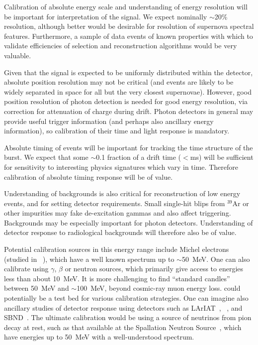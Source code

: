 Calibration of absolute energy scale and understanding of energy resolution will be important for interpretation of the signal. We expect nominally $\sim$\num{20}\% resolution, although better would be desirable for resolution of supernova spectral features. Furthermore, a sample of data events of known properties with which to validate efficiencies of selection and reconstruction algorithms would be very valuable.

Given that the signal is expected to be uniformly distributed within the detector, absolute position resolution may not be critical (and events are likely to be widely separated in space for all but the very closest supernovae). However, good position resolution of photon detection is needed for good energy resolution, via correction for attenuation of charge during drift. Photon detectors in general may provide useful trigger information (and perhaps also ancillary energy information), so calibration of their time and light response is mandatory.

Absolute timing of events will be important for tracking the time structure of the burst. We expect that some $\sim$\num{0.1} fraction of a drift time ($<$\si{\ms}) will be sufficient for sensitivity to interesting physics signatures which vary in time. Therefore calibration of absolute timing response will be of value.

Understanding of backgrounds is also critical for reconstruction of low energy events, and for setting detector requirements. Small single-hit blips from $^{39}$Ar or other impurities may fake de-excitation gammas and also affect triggering. Backgrounds may be especially important for photon detectors.  Understanding of detector response to radiological backgrounds will therefore also be of value.

Potential calibration sources in this energy range include Michel electrons (studied in ~\cite{bib:uBmichel}), which have a well known spectrum up to $\sim$50~MeV. One can also calibrate using $\gamma$, $\beta$ or neutron sources, which primarily give access to energies less than about 10~MeV. It is more challenging to find ``standard candles'' between 50~MeV and $\sim$\SI{100}{\MeV}, beyond cosmic-ray muon energy loss.  could potentially be a test bed for various calibration strategies. One can imagine also ancillary studies of detector response using detectors such as LArIAT~\cite{bib:LArIAT}, ~\cite{bib:uB}, and SBND~\cite{bib:sbnd}. The ultimate calibration would be using a source of neutrinos from pion decay at rest, such as that available at the Spallation Neutron Source~\cite{bib:sns}, which have energies up to \SI{50}{\MeV} with a well-understood spectrum.

